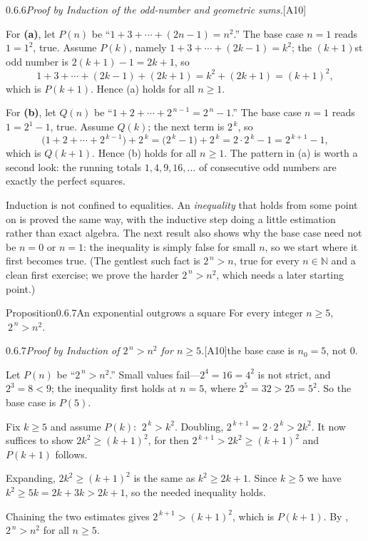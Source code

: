 \documentclass[main.tex]{subfiles}
\begin{document}
\begin{Prf}{0.6.6}{\itshape Proof by Induction of the odd-number and geometric sums.}{[A10]}
\item For \textbf{(a)}, let $P(n)$ be ``$1+3+\cdots+(2n-1)=n^2$.'' The base case $n=1$ reads $1=1^2$,
true. Assume $P(k)$, namely $1+3+\cdots+(2k-1)=k^2$; the $(k+1)$st odd number is $2(k+1)-1=2k+1$, so
\[
1+3+\cdots+(2k-1)+(2k+1)=k^2+(2k+1)=(k+1)^2,
\]
which is $P(k+1)$. Hence (a) holds for all $n\ge 1$.
\item For \textbf{(b)}, let $Q(n)$ be ``$1+2+\cdots+2^{\,n-1}=2^{\,n}-1$.'' The base case $n=1$ reads
$1=2^1-1$, true. Assume $Q(k)$; the next term is $2^{\,k}$, so
\[
\bigl(1+2+\cdots+2^{\,k-1}\bigr)+2^{\,k}=\bigl(2^{\,k}-1\bigr)+2^{\,k}=2\cdot 2^{\,k}-1=2^{\,k+1}-1,
\]
which is $Q(k+1)$. Hence (b) holds for all $n\ge 1$. The pattern in (a) is worth a second look: the
running totals $1,4,9,16,\dots$ of consecutive odd numbers are exactly the perfect squares.
\end{Prf}

\noindent Induction is not confined to equalities. An \emph{inequality} that holds from some point on
is proved the same way, with the inductive step doing a little estimation rather than exact algebra.
The next result also shows why the base case need not be $n=0$ or $n=1$: the inequality is simply
false for small $n$, so we start where it first becomes true. (The gentlest such fact is
$2^{\,n}>n$, true for every $n\in\mathbb N$ and a clean first exercise; we prove the harder
$2^{\,n}>n^2$, which needs a later starting point.)

\begin{Obj}{Proposition}{0.6.7}{An exponential outgrows a square}
For every integer $n\ge 5$, $\ 2^{\,n}>n^2$.
\end{Obj}

\begin{Prf}{0.6.7}{\itshape Proof by Induction of $2^{\,n}>n^2$ for $n\ge 5$.}{[A10]\enspace the base case is $n_0=5$, not $0$.}
\item Let $P(n)$ be ``$2^{\,n}>n^2$.'' Small values fail---$2^4=16=4^2$ is not strict, and $2^3=8<9$;
the inequality first holds at $n=5$, where $2^5=32>25=5^2$. So the base case is $P(5)$.
\item Fix $k\ge 5$ and assume $P(k)$: $\ 2^{\,k}>k^2$. Doubling, $2^{\,k+1}=2\cdot 2^{\,k}>2k^2$. It
now suffices to show $2k^2\ge(k+1)^2$, for then $2^{\,k+1}>2k^2\ge(k+1)^2$ and $P(k+1)$ follows.
\item Expanding, $2k^2\ge(k+1)^2$ is the same as $k^2\ge 2k+1$. Since $k\ge 5$ we have
$k^2\ge 5k=2k+3k>2k+1$, so the needed inequality holds.
\item Chaining the two estimates gives $2^{\,k+1}>(k+1)^2$, which is $P(k+1)$. By ,
$2^{\,n}>n^2$ for all $n\ge 5$.
\end{Prf}
\end{document}

